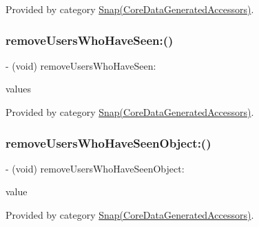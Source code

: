 Provided by category \hyperlink{category_snap_07_core_data_generated_accessors_08_a05c43e998f06072a2768e7db4b34a04d}{Snap(\+Core\+Data\+Generated\+Accessors)}.

\hypertarget{interface_snap_af4fa1e8b7b4cdd429c312312704b61ab}{}\label{interface_snap_af4fa1e8b7b4cdd429c312312704b61ab} 
\subsubsection{\texorpdfstring{remove\+Users\+Who\+Have\+Seen\+:()}{removeUsersWhoHaveSeen:()}}
{\footnotesize\ttfamily -\/ (void) remove\+Users\+Who\+Have\+Seen\+: \begin{DoxyParamCaption}\item[{(N\+S\+Set$<$ \hyperlink{interface_friend}{Friend} $\ast$ $>$ $\ast$)}]{values }\end{DoxyParamCaption}}



Provided by category \hyperlink{category_snap_07_core_data_generated_accessors_08_af4fa1e8b7b4cdd429c312312704b61ab}{Snap(\+Core\+Data\+Generated\+Accessors)}.

\hypertarget{interface_snap_ab97c4c0a0f132f6f420ac3127dcd9142}{}\label{interface_snap_ab97c4c0a0f132f6f420ac3127dcd9142} 
\subsubsection{\texorpdfstring{remove\+Users\+Who\+Have\+Seen\+Object\+:()}{removeUsersWhoHaveSeenObject:()}}
{\footnotesize\ttfamily -\/ (void) remove\+Users\+Who\+Have\+Seen\+Object\+: \begin{DoxyParamCaption}\item[{(\hyperlink{interface_friend}{Friend} $\ast$)}]{value }\end{DoxyParamCaption}}



Provided by category \hyperlink{category_snap_07_core_data_generated_accessors_08_ab97c4c0a0f132f6f420ac3127dcd9142}{Snap(\+Core\+Data\+Generated\+Accessors)}.



